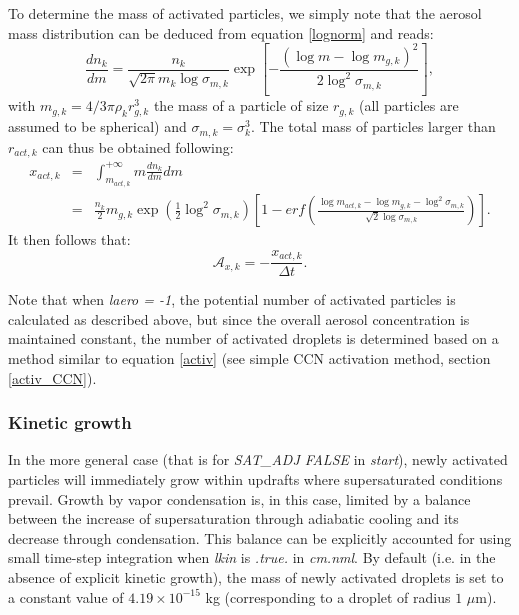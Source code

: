 \documentclass[12pt,A4,french]{article}
\begin{document}
To determine the mass of activated particles, we simply note that the aerosol mass distribution can be deduced from equation \ref{lognorm} and reads:
\begin{equation}
    \frac{dn_k}{dm} = \frac{n_k}{\sqrt{2\pi}m_k\log\sigma_{m,k}}\exp\left[-\frac{\left(\log m - \log m_{g,k}\right)^2}{2\log^2\sigma_{m,k}}\right],
\end{equation}
with $m_{g,k} = 4/3\pi\rho_k r_{g,k}^3$ the mass of a particle of size $r_{g,k}$ (all particles are assumed to be spherical) and $\sigma_{m,k} = \sigma_k^3$. The total mass of particles larger than $r_{act,k}$ can thus be obtained following:
\begin{eqnarray}
    x_{act,k} &=& \int_{m_{act,k}}^{+\infty} m \frac{dn_k}{dm} dm \\
    &=& \frac{n_k}{2} m_{g,k} \exp\left(\frac{1}{2}\log^2\sigma_{m,k}\right)\left[1 - erf\left(\frac{\log m_{act,k} - \log m_{g,k} - \log^2\sigma_{m,k}}{\sqrt{2}\log\sigma_{m,k}}\right)\right].
\end{eqnarray}
It then follows that:
\begin{equation}
    \mathcal{A}_{x,k} = -\frac{x_{act,k}}{\Delta t}.
\end{equation}

Note that when {\it laero = -1}, the potential number of activated particles is calculated as described above, but since the overall aerosol concentration is maintained constant, the number of activated droplets is determined based on a method similar to equation \ref{activ} (see simple CCN activation method, section \ref{activ_CCN}).

\subsubsection{Kinetic growth}
\label{growth}

In the more general case (that is for {\it SAT\_ADJ FALSE} in {\it start}), newly activated particles will immediately grow within updrafts where supersaturated conditions prevail. Growth by vapor condensation is, in this case, limited by a balance between the increase of supersaturation through adiabatic cooling and its decrease through condensation. This balance can be explicitly accounted for using small time-step integration when {\it lkin} is {\it .true.} in {\it cm.nml}. By default (i.e. in the absence of explicit kinetic growth), the mass of newly activated droplets is set to a constant value of $4.19\times 10^{-15}$ kg (corresponding to a droplet of radius $1$ $\mu$m).
\end{document}
